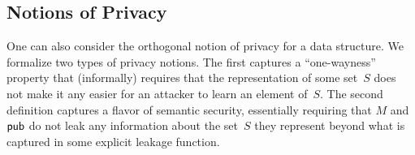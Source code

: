 
\subsection{Notions of Privacy}
One can also consider the orthogonal notion of privacy for a
data structure. 
We formalize two types of privacy notions. The first captures
a ``one-wayness'' property that (informally) requires that
the representation of some set~$S$ does not make it any easier for an attacker
to learn an element of~$S$.
The second definition
captures a flavor of semantic security, essentially requiring that $M$ and ${\sf pub}$ do
not leak any information about the set~$S$ they represent beyond
what is captured in some explicit leakage function.



